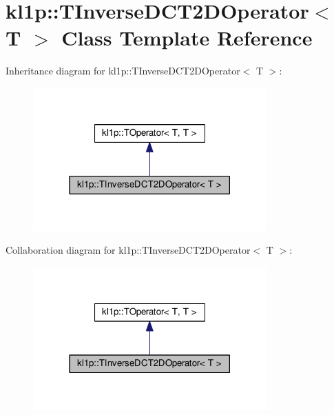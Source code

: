 \hypertarget{classkl1p_1_1TInverseDCT2DOperator}{}\section{kl1p\+:\+:T\+Inverse\+D\+C\+T2\+D\+Operator$<$ T $>$ Class Template Reference}
\label{classkl1p_1_1TInverseDCT2DOperator}


Inheritance diagram for kl1p\+:\+:T\+Inverse\+D\+C\+T2\+D\+Operator$<$ T $>$\+:
\nopagebreak
\begin{figure}[H]
\begin{center}
\leavevmode
\includegraphics[width=254pt]{classkl1p_1_1TInverseDCT2DOperator__inherit__graph}
\end{center}
\end{figure}


Collaboration diagram for kl1p\+:\+:T\+Inverse\+D\+C\+T2\+D\+Operator$<$ T $>$\+:
\nopagebreak
\begin{figure}[H]
\begin{center}
\leavevmode
\includegraphics[width=254pt]{classkl1p_1_1TInverseDCT2DOperator__coll__graph}
\end{center}
\end{figure}
